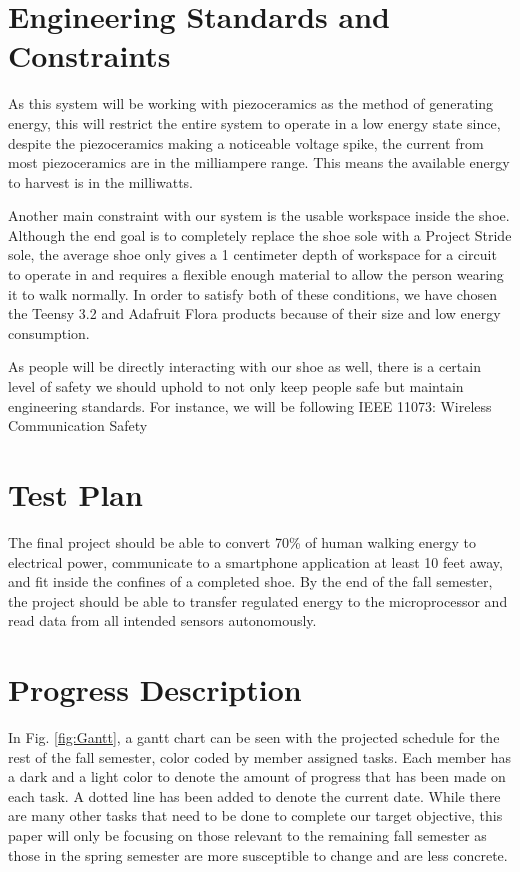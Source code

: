 \documentclass[letterpaper, 12 pt, onecolumn, hidelinks]{ieeetran}
\begin{document}
\section{Engineering Standards and Constraints}\label{sec:Standards}

As this system will be working with piezoceramics as the method of generating energy, this will restrict the entire system to operate in a low energy state since, despite the piezoceramics making a noticeable voltage spike, the current from most piezoceramics are in the milliampere range. This means the available energy to harvest is in the milliwatts.

Another main constraint with our system is the usable workspace inside the shoe. Although the end goal is to completely replace the shoe sole with a Project Stride sole, the average shoe only gives a 1 centimeter depth of workspace for a circuit to operate in and requires a flexible enough material to allow the person wearing it to walk normally. In order to satisfy both of these conditions, we have chosen the Teensy 3.2 and Adafruit Flora products because of their size and low energy consumption. 

As people will be directly interacting with our shoe as well, there is a certain level of safety we should uphold to not only keep people safe but maintain engineering standards. For instance, we will be following IEEE 11073: Wireless Communication Safety

\section{Test Plan}\label{sec:Plan}
The final project should be able to convert 70\% of human walking energy to electrical power, communicate to a smartphone application at least 10 feet away, and fit inside the confines of a completed shoe. By the end of the fall semester, the project should be able to transfer regulated energy to the microprocessor and read data from all intended sensors autonomously.

\section{Progress Description}\label{sec:Progress}
In Fig. \ref{fig:Gantt}, a gantt chart can be seen with the projected schedule for the rest of the fall semester, color coded by member assigned tasks. Each member has a dark and a light color to denote the amount of progress that has been made on each task. A dotted line has been added to denote the current date. While there are many other tasks that need to be done to complete our target objective, this paper will only be focusing on those relevant to the remaining fall semester as those in the spring semester are more susceptible to change and are less concrete.
\end{document}
